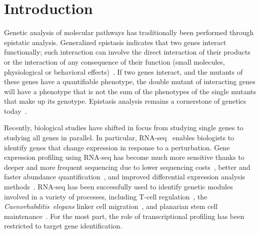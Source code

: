 \documentclass[10pt, onecolumn]{article}
\begin{document}
\section*{Introduction}
\label{sec:introduction}
Genetic analysis of molecular pathways has traditionally been performed
through epistatic analysis. Generalized epistasis indicates that two genes interact
functionally; such interaction can involve the direct interaction of their
products or the interaction of any consequence of their function (small molecules,
physiological or behavioral effects)~\cite{Huang2006}. If two
genes interact, and the mutants of these genes have a quantifiable phenotype,
the double mutant of interacting genes will have a phenotype that is not the sum
of the phenotypes of the single mutants that make up its genotype. Epistasis
analysis remains a cornerstone of genetics today~\cite{Phillips2008}.

Recently, biological studies have shifted in focus from studying single
genes to studying all genes in parallel. In particular,
RNA-seq~\cite{Mortazavi2008} enables biologists to
identify genes that change expression in response to a perturbation. Gene expression
profiling using RNA-seq has become much more sensitive thanks to deeper and more
frequent sequencing due to lower sequencing costs~\cite{Metzker2010},
better and faster abundance quantification~\cite{Patro2014,Bray2016,Patro2015},
and improved differential expression analysis
methods~\cite{Pimentel2016,Trapnell2013}. RNA-seq has been
successfully used to identify genetic modules involved in a variety of processes,
including T-cell regulation~\cite{Singer2016,Shalek2013}, the
\emph{Caenorhabditis~elegans} linker cell migration~\cite{Schwarz2012}, and
planarian stem cell maintenance~\cite{VanWolfswinkel2014,Scimone2014}. For the
most part, the role of transcriptional profiling has been restricted to target
gene identification.
\end{document}
